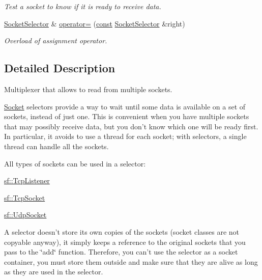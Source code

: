 \begin{DoxyCompactItemize}
\begin{DoxyCompactList}\small\item\em Test a socket to know if it is ready to receive data. \end{DoxyCompactList}\item 
\hyperlink{classsf_1_1_socket_selector}{Socket\-Selector} \& \hyperlink{classsf_1_1_socket_selector_ae6395c7a8d29a9ea14939cc5d1ba3a33}{operator=} (\hyperlink{term__entry_8h_a57bd63ce7f9a353488880e3de6692d5a}{const} \hyperlink{classsf_1_1_socket_selector}{Socket\-Selector} \&right)
\begin{DoxyCompactList}\small\item\em Overload of assignment operator. \end{DoxyCompactList}\end{DoxyCompactItemize}


\subsection{Detailed Description}
Multiplexer that allows to read from multiple sockets. 

\hyperlink{classsf_1_1_socket}{Socket} selectors provide a way to wait until some data is available on a set of sockets, instead of just one. This is convenient when you have multiple sockets that may possibly receive data, but you don't know which one will be ready first. In particular, it avoids to use a thread for each socket; with selectors, a single thread can handle all the sockets.

All types of sockets can be used in a selector\-: \begin{DoxyItemize}
\item \hyperlink{classsf_1_1_tcp_listener}{sf\-::\-Tcp\-Listener} \item \hyperlink{classsf_1_1_tcp_socket}{sf\-::\-Tcp\-Socket} \item \hyperlink{classsf_1_1_udp_socket}{sf\-::\-Udp\-Socket}\end{DoxyItemize}
A selector doesn't store its own copies of the sockets (socket classes are not copyable anyway), it simply keeps a reference to the original sockets that you pass to the \char`\"{}add\char`\"{} function. Therefore, you can't use the selector as a socket container, you must store them outside and make sure that they are alive as long as they are used in the selector.

